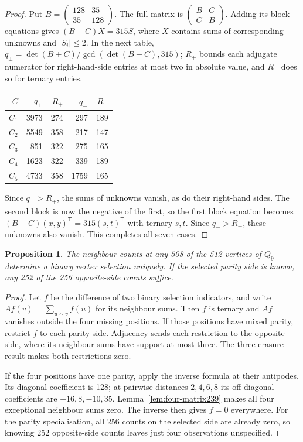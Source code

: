 \documentclass[11pt,a4paper]{article}
\newtheorem{proposition}[theorem]{Proposition}
\theoremstyle{definition}
\theoremstyle{remark}
\begin{document}
\begin{proof}
Put $B=\left(\begin{smallmatrix}128&35\\35&128\end{smallmatrix}\right)$.
The full matrix is $\left(\begin{smallmatrix}B&C\\C&B\end{smallmatrix}\right)$.
Adding its block equations gives $(B+C)X=315S$, where $X$ contains
sums of corresponding unknowns and $|S_i|\le2$. In the next table,
$q_\pm=\det(B\pm C)/\gcd(\det(B\pm C),315)$;
$R_+$ bounds each adjugate numerator for right-hand-side entries at
most two in absolute value, and $R_-$ does so for ternary entries.
\begin{center}
\begin{tabular}{rrrrr}
\toprule
$C$ & $q_+$ & $R_+$ & $q_-$ & $R_-$\\
\midrule
$C_1$ & 3973 & 274 & 297 & 189\\
$C_2$ & 5549 & 358 & 217 & 147\\
$C_3$ & 851 & 322 & 275 & 165\\
$C_4$ & 1623 & 322 & 339 & 189\\
$C_5$ & 4733 & 358 & 1759 & 165\\
\bottomrule
\end{tabular}
\end{center}
Since $q_+>R_+$, the sums of unknowns vanish, as do their right-hand
sides. The second block is now the negative of the first, so the first
block equation becomes $(B-C)(x,y)^{\mathsf T}=315(s,t)^{\mathsf T}$
with ternary $s,t$. Since $q_->R_-$, these unknowns also vanish.
This completes all seven cases.
\end{proof}

\begin{proposition}\label{prop:four-erasure239}
The neighbour counts at any 508 of the 512 vertices of $Q_9$ determine
a binary vertex selection uniquely. If the selected parity side is
known, any 252 of the 256 opposite-side counts suffice.
\end{proposition}
\begin{proof}
Let $f$ be the difference of two binary selection indicators, and
write $Af(v)=\sum_{u\sim v}f(u)$ for its neighbour sums. Then $f$ is
ternary and $Af$ vanishes outside the four missing positions.
If those positions have mixed parity, restrict $f$ to each parity
side. Adjacency sends each restriction to the opposite side, where
its neighbour sums have support at most three. The three-erasure
result makes both restrictions zero.

If the four positions have one parity, apply the inverse formula at
their antipodes. Its diagonal coefficient is 128; at pairwise distances
$2,4,6,8$ its off-diagonal coefficients are $-16,8,-10,35$.
Lemma~\ref{lem:four-matrix239} makes all four exceptional neighbour
sums zero. The inverse then gives $f=0$ everywhere. For the parity
specialisation, all 256 counts on the selected side are already zero,
so knowing 252 opposite-side counts leaves just four observations
unspecified.
\end{proof}
\end{document}
